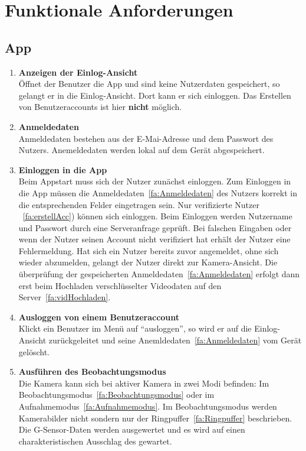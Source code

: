 \chapter{Funktionale Anforderungen}

\section{\gls{App}}
\begin{enumerate}
\renewcommand{\labelenumi}{\textbf{\theenumi}}
\renewcommand{\theenumi}{FA\arabic{enumi}0}
\setcounter{enumi}{99}
\item \textbf{Anzeigen der Einlog-Ansicht} \hfill \\
Öffnet der Benutzer die \gls{App} und sind keine Nutzerdaten gespeichert, so gelangt er in die Einlog-Ansicht. Dort kann er sich einloggen. Das Erstellen von Benutzeraccounts ist hier \textbf{nicht} möglich.

\item \label{fa:Anmeldedaten}\textbf{Anmeldedaten} \hfill \\
Anmeldedaten bestehen aus der E-Mai-Adresse und dem Passwort des Nutzers. Anemeldedaten werden lokal auf dem Gerät abgespeichert.

\item \textbf{Einloggen in die \gls{App}} \hfill \\
Beim Appstart muss sich der Nutzer zunächst einloggen. Zum Einloggen in die \gls{App} müssen die Anmeldedaten~\eqref{fa:Anmeldedaten} des Nutzers korrekt in die entsprechenden Felder eingetragen sein. Nur verifizierte Nutzer ~\eqref{fa:erstellAcc}) können sich einloggen. Beim Einloggen werden Nutzername und Passwort durch eine Serveranfrage geprüft. Bei falschen Eingaben oder wenn der Nutzer seinen Account nicht verifiziert hat erhält der Nutzer eine Fehlermeldung. Hat sich ein Nutzer bereits zuvor angemeldet, ohne sich wieder abzumelden, gelangt der Nutzer direkt zur Kamera-Ansicht. Die überprüfung der gespeicherten Anmeldedaten~\eqref{fa:Anmeldedaten} erfolgt dann erst beim Hochladen verschlüsselter Videodaten auf den Server~\eqref{fa:vidHochladen}.

\item \label{fa:logOut}\textbf{Ausloggen von einem Benutzeraccount} \hfill \\
Klickt ein Benutzer im Menü auf ``ausloggen'', so wird er auf die Einlog-Ansicht zurückgeleitet und seine Anemldedaten~\eqref{fa:Anmeldedaten} vom Gerät gelöscht.

\item \label{fa:Beobachtungsmodus}\textbf{Ausführen des Beobachtungsmodus} \hfill \\
Die Kamera kann sich bei aktiver Kamera in zwei Modi befinden: Im Beobachtungsmodus~\eqref{fa:Beobachtungsmodus} oder im Aufnahmemodus~\eqref{fa:Aufnahmemodus}.
Im Beobachtungsmodus werden Kamerabilder nicht  sondern nur der \gls{Ringpuffer}~\eqref{fa:Ringpuffer} beschrieben. Die \gls{G-Sensor}-Daten werden ausgewertet und es wird auf einen charakteristischen Ausschlag des  gewartet.


\end{enumerate}
